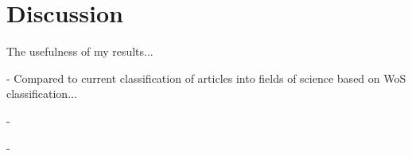 \chapter{Discussion}
\label{chapter:discussion}

The usefulness of my results...

- Compared to current classification of articles into fields of 
science based on WoS classification...

- 

- 
